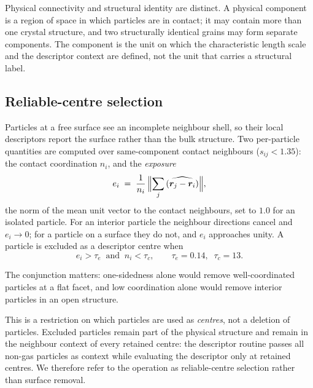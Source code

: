 Physical connectivity and structural identity are distinct. A physical component is a
region of space in which particles are in contact; it may contain more than one crystal
structure, and two structurally identical grains may form separate components. The
component is the unit on which the characteristic length scale and the descriptor context
are defined, not the unit that carries a structural label.

\subsection{Reliable-centre selection}
\label{sec:centres}

Particles at a free surface see an incomplete neighbour shell, so their local descriptors
report the surface rather than the bulk structure. Two per-particle quantities are computed
over same-component contact neighbours ($s_{ij} < 1.35$): the contact coordination
$n_i$, and the \emph{exposure}
\begin{equation}
  e_i \;=\; \frac{1}{n_i}\,\Bigl\lVert \sum_{j} \widehat{(\bm{r}_j - \bm{r}_i)} \Bigr\rVert,
  \label{eq:exposure}
\end{equation}
the norm of the mean unit vector to the contact neighbours, set to $1.0$ for an isolated
particle. For an interior particle the neighbour directions cancel and $e_i \to 0$; for a
particle on a surface they do not, and $e_i$ approaches unity. A particle is excluded as a
descriptor centre when
\begin{equation}
  e_i > \tau_e \;\;\text{and}\;\; n_i < \tau_c,
  \qquad \tau_e = 0.14,\;\; \tau_c = 13 .
  \label{eq:m3}
\end{equation}

The conjunction matters: one-sidedness alone would remove well-coordinated particles at a
flat facet, and low coordination alone would remove interior particles in an open structure.

This is a restriction on which particles are used as \emph{centres}, not a deletion of
particles. Excluded particles remain part of the physical structure and remain in the
neighbour context of every retained centre: the descriptor routine passes all non-gas
particles as context while evaluating the descriptor only at retained centres. We therefore
refer to the operation as reliable-centre selection rather than surface removal.

